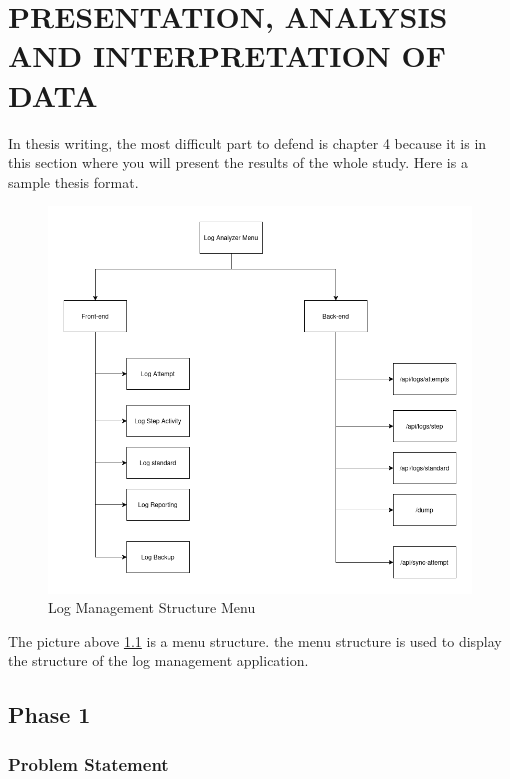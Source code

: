 \chapter{PRESENTATION, ANALYSIS AND INTERPRETATION OF DATA}
In thesis writing, the most difficult part to defend is chapter 4 because it is in this section where you will present the results of the whole study. Here is a sample thesis format.
\begin{figure}[H] 
    \centering
    \includegraphics[width=14cm]{figure/structure menu.png}
    \caption{Log Management Structure Menu}
    \label{fig:structure-menu}
\end{figure}

The picture above \ref{fig:structure-menu} is a menu structure. the menu structure is used to display the structure of the log management application.
\section{Phase 1}

\subsection{Problem Statement}

